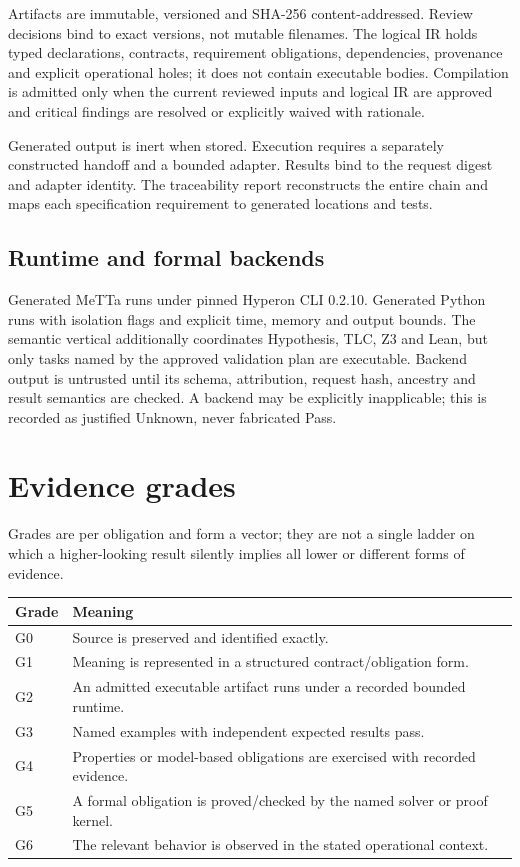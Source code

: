 \documentclass[11pt]{article}
\begin{document}
Artifacts are immutable, versioned and SHA-256 content-addressed.  Review
decisions bind to exact versions, not mutable filenames.  The logical IR holds
typed declarations, contracts, requirement obligations, dependencies,
provenance and explicit operational holes; it does not contain executable
bodies.  Compilation is admitted only when the current reviewed inputs and
logical IR are approved and critical findings are resolved or explicitly
waived with rationale.

Generated output is inert when stored.  Execution requires a separately
constructed handoff and a bounded adapter.  Results bind to the request digest
and adapter identity.  The traceability report reconstructs the entire chain
and maps each specification requirement to generated locations and tests.

\subsection{Runtime and formal backends}

Generated MeTTa runs under pinned Hyperon CLI 0.2.10.  Generated Python runs
with isolation flags and explicit time, memory and output bounds.  The
semantic vertical additionally coordinates Hypothesis, TLC, Z3 and Lean, but
only tasks named by the approved validation plan are executable.  Backend
output is untrusted until its schema, attribution, request hash, ancestry and
result semantics are checked.  A backend may be explicitly inapplicable; this
is recorded as justified Unknown, never fabricated Pass.

\section{Evidence grades}

Grades are per obligation and form a vector; they are not a single ladder on
which a higher-looking result silently implies all lower or different forms of
evidence.

\begin{tabularx}{\textwidth}{@{}lX@{}}
\toprule
Grade & Meaning \\
\midrule
G0 & Source is preserved and identified exactly. \\
G1 & Meaning is represented in a structured contract/obligation form. \\
G2 & An admitted executable artifact runs under a recorded bounded runtime. \\
G3 & Named examples with independent expected results pass. \\
G4 & Properties or model-based obligations are exercised with recorded evidence. \\
G5 & A formal obligation is proved/checked by the named solver or proof kernel. \\
G6 & The relevant behavior is observed in the stated operational context. \\
\bottomrule
\end{tabularx}
\end{document}

